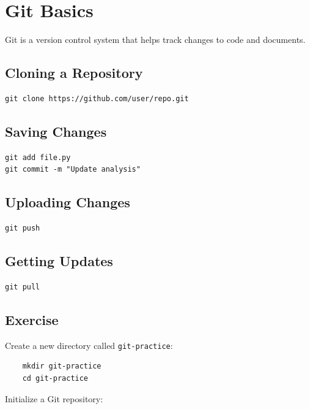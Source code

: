 \section{Git Basics}

Git is a version control system that helps track changes to code and documents.

\subsection{Cloning a Repository}

\begin{lstlisting}
git clone https://github.com/user/repo.git
\end{lstlisting}

\subsection{Saving Changes}

\begin{lstlisting}
git add file.py
git commit -m "Update analysis"
\end{lstlisting}

\subsection{Uploading Changes}

\begin{lstlisting}
git push
\end{lstlisting}

\subsection{Getting Updates}

\begin{lstlisting}
git pull
\end{lstlisting}

\subsection{Exercise} 

Create a new directory called \texttt{git-practice}: 

\begin{lstlisting} 
    mkdir git-practice 
    cd git-practice 
\end{lstlisting} 

Initialize a Git repository: 

